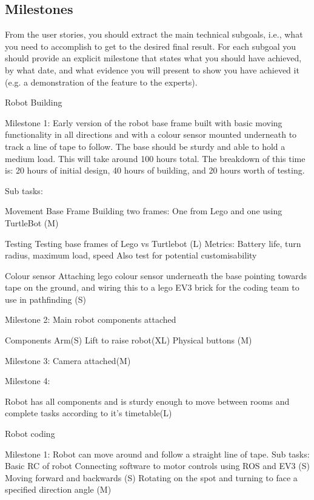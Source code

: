 \documentclass{article}
\begin{document}
\subsection{Milestones} 
From the user stories, you should extract the main technical subgoals, i.e., what you need to accomplish to get to the desired final result. For each subgoal you should provide an explicit milestone that states what you should have achieved, by what date, and what evidence you will present to show you have achieved it (e.g. a demonstration of the feature to the experts).

Robot Building

Milestone 1: Early version of the robot base frame built with basic moving functionality in all directions and with a colour sensor mounted underneath to track a line of tape to follow. The base should be sturdy and able to hold a medium load. This will take around 100 hours total. The breakdown of this time is: 20 hours of initial design, 40 hours of building, and 20 hours worth of testing.

Sub tasks:

Movement Base Frame
    Building two frames: One from Lego and one using TurtleBot (M)
    
Testing
    Testing base frames of Lego vs Turtlebot (L)
    Metrics: Battery life, turn radius, maximum load, speed
    Also test for potential customisability
    
Colour sensor
    Attaching lego colour sensor underneath the base pointing towards tape on the ground, and wiring this to a lego EV3 brick for the       coding team to use in pathfinding (S)
    
Milestone 2: Main robot components attached

Components
    Arm(S)
    Lift to raise robot(XL)
    Physical buttons (M)
    
Milestone 3: Camera attached(M)

Milestone 4:

Robot has all components and is sturdy enough to move between rooms and complete tasks according to it's timetable(L) 



Robot coding

Milestone 1: Robot can move around and follow a straight line of tape.
Sub tasks: 
Basic RC of robot
    Connecting software to motor controls using ROS and EV3 (S)
    Moving forward and backwards (S)
    Rotating on the spot and turning to face a specified direction angle (M)
    
\end{document}
